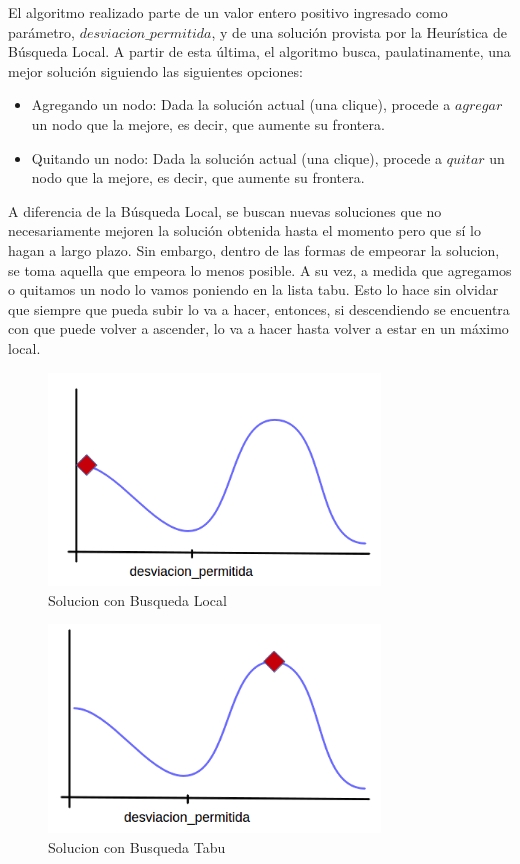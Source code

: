  El algoritmo realizado parte de un valor entero positivo ingresado como parámetro, $desviacion\_permitida$, y de una solución provista por la Heurística de Búsqueda Local. A partir de esta última, el algoritmo busca, paulatinamente, una mejor solución siguiendo las siguientes opciones:
\begin{itemize}
 \item Agregando un nodo: Dada la solución actual (una clique), procede a $agregar$ un nodo que la mejore, es decir, que aumente su frontera.
 \item Quitando un nodo: Dada la solución actual (una clique), procede a $quitar$ un nodo que la mejore, es decir, que aumente su frontera.
\end{itemize}
A diferencia de la Búsqueda Local, se buscan nuevas soluciones que no necesariamente mejoren la solución obtenida hasta el momento pero que sí lo hagan a largo plazo. Sin embargo, dentro de las formas de empeorar la solucion, se toma aquella que empeora lo menos posible. A su vez, a medida que agregamos o quitamos un nodo lo vamos poniendo en la lista tabu. Esto lo hace sin olvidar que siempre que pueda subir lo va a hacer, entonces, si descendiendo se encuentra con que puede volver a ascender, lo va a hacer hasta volver a estar en un máximo local.\newline

\begin{figure}[H] %
\begin{center}
\includegraphics[width=250pt]{../imgs/1_tabu.png}
\caption{Solucion con Busqueda Local}
\end{center}
\end{figure}


\begin{figure}[H] %
\begin{center}
\includegraphics[width=250pt]{../imgs/2_tabu.png}
\caption{Solucion con Busqueda Tabu}
\end{center}
\end{figure}

